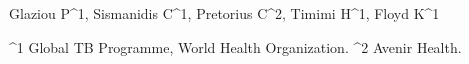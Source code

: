 Glaziou P^1, Sismanidis C^1, Pretorius C^2, Timimi H^1, Floyd K^1

^1 Global TB Programme, World Health Organization.
^2 Avenir Health.
  